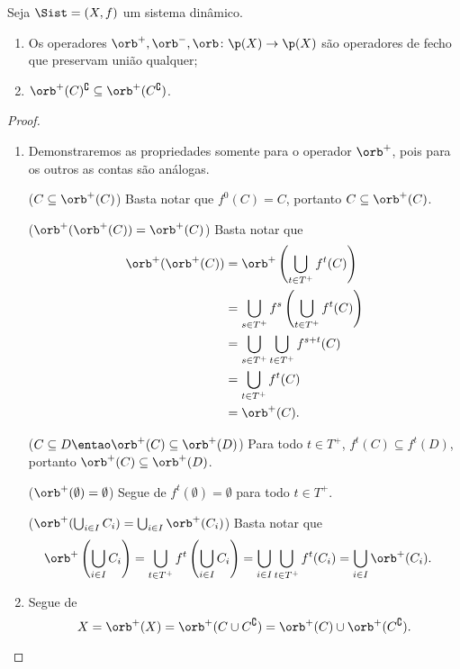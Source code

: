\begin{proposition}
Seja $\Sist=(X,f)$ um sistema dinâmico.
	\begin{enumerate}
	\item Os operadores $\orb^+, \orb^-,\orb\colon \p(X) \to \p(X)$ são operadores de fecho que preservam união qualquer;
	\item $\orb^+(C)^\complement \subseteq \orb^+(C^\complement)$.
	\end{enumerate}
\end{proposition}
\begin{proof}
	\begin{enumerate}
	\item Demonstraremos as propriedades somente para o operador $\orb^+$, pois para os outros as contas são análogas.

($C \subseteq \orb^+(C)$)
Basta notar que $f^0(C)=C$, portanto $C \subseteq \orb^+(C)$.

($\orb^+(\orb^+(C)) = \orb^+(C)$)
Basta notar que
		\begin{align*}
		\orb^+(\orb^+(C)) &= \orb^+\left( \bigcup_{t \in T^+} f^t(C) \right) \\
			&= \bigcup_{s \in T^+} f^s\left( \bigcup_{t \in T^+} f^t(C) \right) \\
			&= \bigcup_{s \in T^+} \bigcup_{t \in T^+} f^{s+t}(C) \\
			&= \bigcup_{t \in T^+} f^t(C) \\
			&= \orb^+(C).
		\end{align*}

($C \subseteq D \entao \orb^+(C) \subseteq \orb^+(D)$)
Para todo $t \in T^+$, $f^t(C) \subseteq f^t(D)$, portanto $\orb^+(C) \subseteq \orb^+(D)$.

($\orb^+(\emptyset)=\emptyset$)
Segue de $f^t(\emptyset) = \emptyset$ para todo $t \in T^+$.

($\orb^+(\bigcup_{i \in I} C_i) = \bigcup_{i \in I} \orb^+(C_i)$)
Basta notar que
		\begin{align*}
		\orb^+ \left(\bigcup_{i \in I} C_i \right) &= \bigcup_{t \in T^+} f^t\left(\bigcup_{i \in I} C_i \right) = \bigcup_{i \in I}\bigcup_{t \in T^+} f^t(C_i) = \bigcup_{i \in I} \orb^+(C_i).
		\end{align*}

	\item Segue de
		\begin{equation*}
		X = \orb^+(X) = \orb^+(C \cup C^\complement) = \orb^+(C) \cup \orb^+(C^\complement). \qedhere
		\end{equation*}
	\end{enumerate}
\end{proof}

